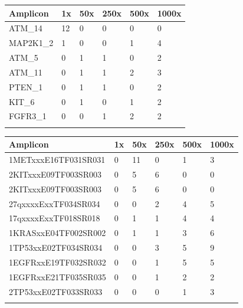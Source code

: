 \begin{minipage}{0.5\textwidth}
\begin{tabular}{p{3cm} p{1.5cm} p{1.5cm}}\\
\hline
Amplicon & 1x & 50x & 250x & 500x & 1000x \\
\hline
ATM\_14 & 12 & 0 & 0 & 0 & 0 \\
MAP2K1\_2 & 1 & 0 & 0 & 1 & 4 \\
ATM\_5 & 0 & 1 & 1 & 0 & 2 \\
ATM\_11 & 0 & 1 & 1 & 2 & 3 \\
PTEN\_1 & 0 & 1 & 1 & 0 & 2 \\
KIT\_6 & 0 & 1 & 0 & 1 & 2 \\
FGFR3\_1 & 0 & 0 & 1 & 2 & 2 \\
\label{failed_hpx}
\end{tabular}
\end{minipage}
\hfill
\begin{minipage}{0.5\textwidth}
\begin{tabular}{p{3cm} p{1.5cm} p{1.5cm}}\\
\hline
Amplicon & 1x & 50x & 250x & 500x & 1000x \\
\hline
1METxxxE16TF031SR031 & 0 & 11 & 0 & 1 & 3 \\
2KITxxxE09TF003SR003 & 0 & 5 & 6 & 0 & 0 \\
2KITxxxE09TF003SR003 & 0 & 5 & 6 & 0 & 0 \\
27qxxxxExxTF034SR034 & 0 & 0 & 2 & 4 & 5 \\
17qxxxxExxTF018SR018 & 0 & 1 & 1 & 4 & 4 \\
1KRASxxE04TF002SR002 & 0 & 1 & 1 & 3 & 6 \\
1TP53xxE02TF034SR034 & 0 & 0 & 3 & 5 & 9 \\
1EGFRxxE19TF032SR032 & 0 & 0 & 1 & 5 & 5 \\
1EGFRxxE21TF035SR035 & 0 & 0 & 1 & 2 & 2 \\
2TP53xxE02TF033SR033 & 0 & 0 & 0 & 1 & 3 \\
\label{failed_tst}
\end{tabular}
\end{minipage}

